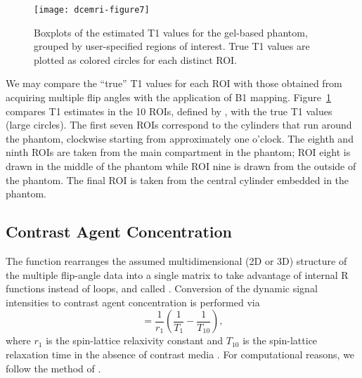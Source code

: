 \documentclass[article]{jss}
\begin{document}
\begin{figure}[!htbp]
\begin{center}
\begin{Schunk}
\end{Schunk}
\texttt{[image: dcemri-figure7]}
\end{center}
\caption{Boxplots of the estimated T1 values for the gel-based
  phantom, grouped by user-specified regions of interest.  True T1
  values are plotted as colored circles for each distinct ROI.}
\label{fig:t1-phantom-boxplot}
\end{figure}

We may compare the ``true'' T1 values for each ROI with those obtained
from acquiring multiple flip angles with the application of B1
mapping.  Figure~\ref{fig:t1-phantom-boxplot} compares T1 estimates in
the 10 ROIs, defined by , with the true T1 values (large
circles).  The first seven ROIs correspond to the cylinders that run
around the phantom, clockwise starting from approximately one o'clock.
The eighth and ninth ROIs are taken from the main compartment in the
phantom; ROI eight is drawn in the middle of the phantom while ROI
nine is drawn from the outside of the phantom.  The final ROI is taken
from the central cylinder embedded in the phantom.

\subsection{Contrast Agent Concentration}

The  function rearranges the assumed multidimensional
(2D or 3D) structure of the multiple flip-angle data into a single
matrix to take advantage of internal R functions instead of loops, and
called .  Conversion of the dynamic signal intensities to
contrast agent concentration is performed via
\begin{equation*}
  [\text{Gd}] = \frac{1}{r_1}\left(\frac{1}{T_1} - \frac{1}{T_{10}}\right),
\end{equation*}
where $r_1$ is the spin-lattice relaxivity constant and $T_{10}$ is
the spin-lattice relaxation time in the absence of contrast media
\citep{buc-par:measuring}.  For computational reasons, we follow the
method of \cite{li-etal:improved}.
\end{document}
